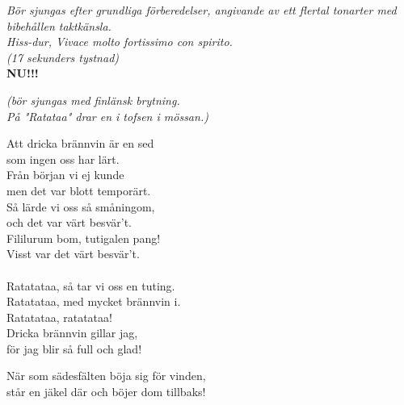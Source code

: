 \documentclass[a6paper,10pt]{article}
\begin{document}
\setlength{\oddsidemargin}{-0.47in}
\noindent
\begin{center}
    \textit{\small Bör sjungas efter grundliga förberedelser, angivande av ett flertal tonarter med bibehållen taktkänsla.\\ Hiss-dur, Vivace molto fortissimo con spirito.\\
(17 sekunders tystnad)}\\
\Large \textbf{NU!!!}
\end{center}
\begin{center}
    \textit{\small (bör sjungas med finlänsk brytning. \\ På "Ratataa" drar en i tofsen i mössan.)}
\end{center}
Att dricka brännvin är en sed \\
som ingen oss har lärt. \\
Från början vi ej kunde \\
men det var blott temporärt. \\
Så lärde vi oss så småningom, \\
och det var värt besvär't. \\
Fililurum bom, tutigalen pang! \\
Visst var det värt besvär't. \\
\vspace{5pt}\\
Ratatataa, så tar vi oss en tuting. \\
Ratatataa, med mycket brännvin i. \\
Ratatataa, ratatataa! \\
Dricka brännvin gillar jag, \\
för jag blir så full och glad! 
\begin{center}
\end{center}
När som sädesfälten böja sig för vinden, \\
står en jäkel där och böjer dom tillbaks! 
\end{document}
